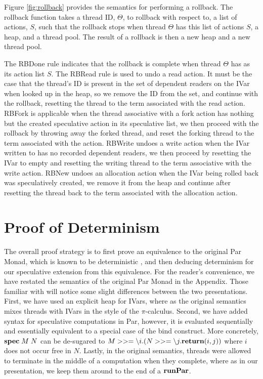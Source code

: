 Figure \ref{fig:rollback} provides the semantics for performing a rollback.  The rollback function takes a thread ID, $\Theta$, to rollback with respect to, a list of actions, $S$, such that the rollback stops when thread $\Theta$ has this list of actions $S$, a heap, and a thread pool.  The result of a rollback is then a new heap and a new thread pool.  

The RBDone rule indicates that the rollback is complete when thread $\Theta$ has as its action list $S$. The RBRead rule is used to undo a read action.  It must be the case that the thread's ID is present in the set of dependent readers on the IVar when looked up in the heap, so we remove the ID from the set, and continue with the rollback, resetting the thread to the term associated with the read action.  RBFork is applicable when the thread associative with a fork action has nothing but the created speculative action in its speculative list, we then proceed with the rollback by throwing away the forked thread, and reset the forking thread to the term associated with the action.  RBWrite undoes a write action when the IVar written to has no recorded dependent readers, we then proceed by resetting the IVar to empty and resetting the writing thread to the term associative with the write action.  RBNew undoes an allocation action when the IVar being rolled back was speculatively created, we remove it from the heap and continue after resetting the thread back to the term associated with the allocation action.  

\section{Proof of Determinism} 
\label{sec:proof}
The overall proof strategy is to first prove an equivalence to the original Par Monad, which is known to be deterministic \cite{par-monad, cnc}, and then deducing determinism for our speculative extension from this equivalence.  For the reader's convenience, we have restated the semantics of the original Par Monad in the Appendix.  Those familiar with \cite{par-monad} will notice some slight differences between the two presentations.  First, we have used an explicit heap for IVars, where as the original semantics mixes threads with IVars in the style of the $\pi$-calculus.  Second, we have added syntax for speculative computations in Par, however, it is evaluated sequentially and essentially equivalent to a special case of the bind construct.  More concretely, $\text{\bf spec} \; M \; N$ can be de-sugared to $M >>= \backslash i. (N >>= \backslash j. \return(i, j))$ where $i$ does not occur free in $N$. Lastly, in the original semantics, threads were allowed to terminate in the middle of a computation when they complete, where as in our presentation, we keep them around to the end of a $\text{\bf runPar}$. 

